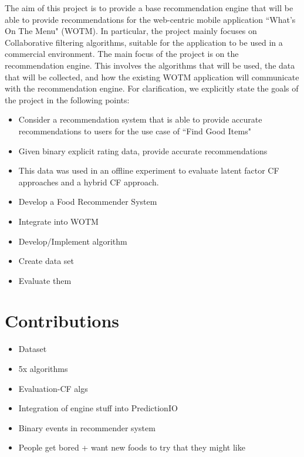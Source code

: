 The aim of this project is to provide a base recommendation engine that will be able to provide recommendations for the web-centric mobile application ``What's On The Menu" (WOTM). In particular, the project mainly focuses on Collaborative filtering algorithms, suitable for the application to be used in a commercial environment. The main focus of the project is on the recommendation engine. This involves the algorithms that will be used, the data that will be collected, and how the existing WOTM application will communicate with the recommendation engine. 
For clarification, we explicitly state the goals of the project in the following points:
\begin{itemize}
	\item{Consider a recommendation system that is able to provide accurate recommendations to users for the use case of ``Find Good Items"}
	\item{Given binary explicit rating data, provide accurate recommendations}
	\item{This data was used in an offline experiment to evaluate latent factor CF approaches and a hybrid CF approach.}
	\item{Develop a Food Recommender System}
	\item{Integrate into WOTM}
	\item{Develop/Implement algorithm}
	\item{Create data set}
	\item{Evaluate them}
\end{itemize}



\section{Contributions}
\begin{itemize}
	\item{Dataset}
	\item{5x algorithms}
	\item{Evaluation-CF algs}
	\item{Integration of engine stuff into PredictionIO}
	\item{Binary events in recommender system}
	\item{People get bored + want new foods to try that they might like}
\end{itemize}